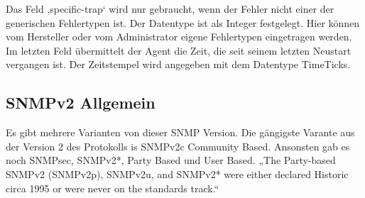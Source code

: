 \documentclass[11pt,a4paper]{article}
\begin{document}
Das Feld ‚specific-trap‘ wird nur gebraucht, wenn der Fehler nicht einer der generischen Fehlertypen ist. Der Datentype ist als Integer festgelegt. Hier können vom Hersteller oder vom Administrator eigene Fehlertypen eingetragen werden.\\
Im letzten Feld übermittelt der Agent die Zeit, die seit seinem letzten Neustart vergangen ist. Der Zeitstempel wird angegeben mit dem Datentype TimeTicks.\\

\subsection{SNMPv2 Allgemein}
Es gibt mehrere Varianten von dieser SNMP Version. Die gängigste Varante aus der Version 2 des Protokolls is SNMPv2c Community Based. Ansonsten gab es noch SNMPsec, SNMPv2*, Party Based und User Based. „The Party-based SNMPv2 (SNMPv2p), SNMPv2u, and SNMPv2* were either declared Historic circa 1995 or were never on the standards track.“ \cite{rfcSnmpNotUsed}
\end{document}
